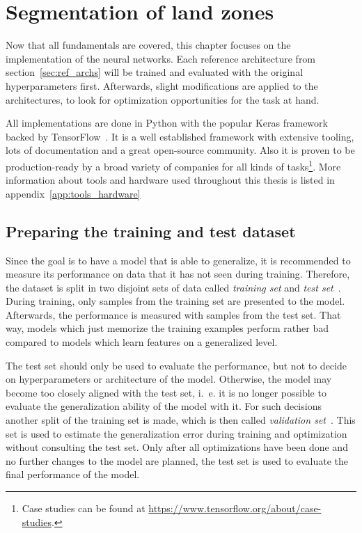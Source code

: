 \section{Segmentation of land zones}
\label{sec:segmentation}

Now that all fundamentals are covered, this chapter focuses on the implementation of the neural networks. Each reference architecture from section~\ref{sec:ref_archs} will be trained and evaluated with the original hyperparameters first. Afterwards, slight modifications are applied to the architectures, to look for optimization opportunities for the task at hand.

All implementations are done in Python with the popular Keras framework backed by TensorFlow~\cite{tf_whitepaper15}. It is a well established framework with extensive tooling, lots of documentation and a great open-source community. Also it is proven to be production-ready by a broad variety of companies for all kinds of tasks\footnote{Case studies can be found at \url{https://www.tensorflow.org/about/case-studies}.}. More information about tools and hardware used throughout this thesis is listed in appendix~\ref{app:tools_hardware}

\subsection{Preparing the training and test dataset}
\label{sec:prepare_train_test}

Since the goal is to have a model that is able to generalize, it is recommended to measure its performance on data that it has not seen during training. Therefore, the dataset is split in two disjoint sets of data called \emph{training set} and \emph{test set}~\cite[p.~101f]{DLbook16}. During training, only samples from the training set are presented to the model. Afterwards, the performance is measured with samples from the test set. That way, models which just memorize the training examples perform rather bad compared to models which learn features on a generalized level.

The test set should only be used to evaluate the performance, but not to decide on hyperparameters or architecture of the model. Otherwise, the model may become too closely aligned with the test set, i.~e. it is no longer possible to evaluate the generalization ability of the model with it. For such decisions another split of the training set is made, which is then called \emph{validation set}~\cite[p.~119]{DLbook16}. This set is used to estimate the generalization error during training and optimization without consulting the test set. Only after all optimizations have been done and no further changes to the model are planned, the test set is used to evaluate the final performance of the model.

